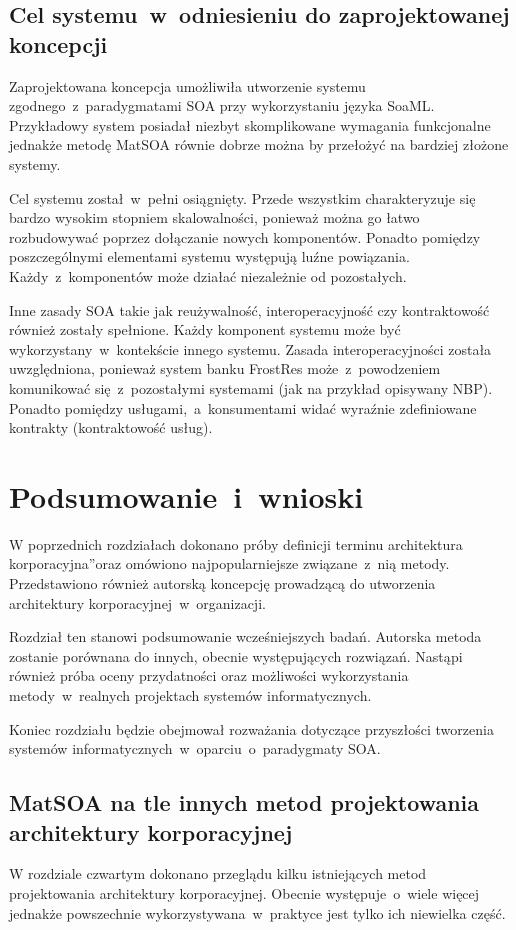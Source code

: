 \section{Cel systemu~w~odniesieniu do zaprojektowanej koncepcji}
Zaprojektowana koncepcja umożliwiła utworzenie systemu zgodnego~z~paradygmatami SOA przy wykorzystaniu języka SoaML. Przykładowy system posiadał niezbyt skomplikowane wymagania funkcjonalne jednakże metodę MatSOA równie dobrze można by przełożyć na bardziej złożone systemy.

Cel systemu został~w~pełni osiągnięty. Przede wszystkim charakteryzuje się bardzo wysokim stopniem skalowalności, ponieważ można go łatwo rozbudowywać poprzez dołączanie nowych komponentów. Ponadto pomiędzy poszczególnymi elementami systemu występują luźne powiązania. Każdy~z~komponentów może działać niezależnie od pozostałych.

Inne zasady SOA takie jak reużywalność, interoperacyjność czy kontraktowość również zostały spełnione. Każdy komponent systemu może być wykorzystany~w~kontekście innego systemu. Zasada interoperacyjności została uwzględniona, ponieważ system banku FrostRes może~z~powodzeniem komunikować się~z~pozostałymi systemami (jak na przykład opisywany NBP). Ponadto pomiędzy usługami,~a~konsumentami widać wyraźnie zdefiniowane kontrakty (kontraktowość usług).

\chapter{Podsumowanie~i~wnioski}
W poprzednich rozdziałach dokonano próby definicji terminu \quotedblbase architektura korporacyjna\textquotedblright oraz omówiono najpopularniejsze związane~z~nią metody. Przedstawiono również autorską koncepcję prowadzącą do utworzenia architektury korporacyjnej~w~organizacji. 

Rozdział ten stanowi podsumowanie wcześniejszych badań. Autorska metoda zostanie porównana do innych, obecnie występujących rozwiązań. Nastąpi również próba oceny przydatności oraz możliwości wykorzystania metody~w~realnych projektach systemów informatycznych.

Koniec rozdziału będzie obejmował rozważania dotyczące przyszłości tworzenia systemów informatycznych~w~oparciu~o~paradygmaty SOA.

\section{MatSOA na tle innych metod projektowania architektury korporacyjnej}
W rozdziale czwartym dokonano przeglądu kilku istniejących metod projektowania architektury korporacyjnej. Obecnie występuje~o~wiele więcej jednakże powszechnie wykorzystywana~w~praktyce jest tylko ich niewielka część.

